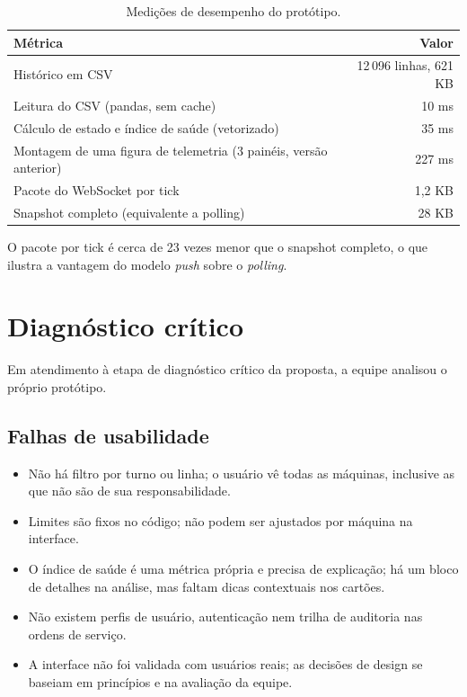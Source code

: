 \documentclass[12pt,a4paper]{article}
\begin{document}
\begin{table}[H]
\centering
\caption{Medições de desempenho do protótipo.}
\label{tab:medicoes}
\begin{tabular}{@{}l r@{}}
\toprule
\textbf{Métrica} & \textbf{Valor}\\
\midrule
Histórico em CSV & 12\,096 linhas, 621 KB\\
Leitura do CSV (pandas, sem cache) & 10 ms\\
Cálculo de estado e índice de saúde (vetorizado) & 35 ms\\
Montagem de uma figura de telemetria (3 painéis, versão anterior) & 227 ms\\
Pacote do WebSocket por tick & 1,2 KB\\
Snapshot completo (equivalente a polling) & 28 KB\\
\bottomrule
\end{tabular}
\end{table}

O pacote por tick é cerca de 23 vezes menor que o snapshot completo, o que ilustra a vantagem do modelo \emph{push} sobre o \emph{polling}.

\section{Diagnóstico crítico}
\label{sec:limitacoes}
Em atendimento à etapa de diagnóstico crítico da proposta, a equipe analisou o próprio protótipo.

\subsection{Falhas de usabilidade}
\begin{itemize}
  \item Não há filtro por turno ou linha; o usuário vê todas as máquinas, inclusive as que não são de sua responsabilidade.
  \item Limites são fixos no código; não podem ser ajustados por máquina na interface.
  \item O índice de saúde é uma métrica própria e precisa de explicação; há um bloco de detalhes na análise, mas faltam dicas contextuais nos cartões.
  \item Não existem perfis de usuário, autenticação nem trilha de auditoria nas ordens de serviço.
  \item A interface não foi validada com usuários reais; as decisões de design se baseiam em princípios e na avaliação da equipe.
\end{itemize}
\end{document}
